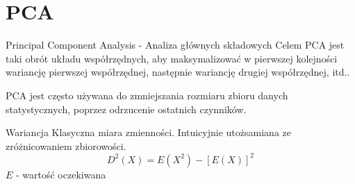 \documentclass[a4paper]{beamer}
\begin{document}
\section{PCA}
\begin{frame}

\begin{block}{Principal Component Analysis - Analiza głównych składowych}
Celem PCA jest taki obrót układu współrzędnych, aby maksymalizować w pierwszej kolejności wariancję pierwszej współrzędnej, następnie wariancję drugiej współrzędnej, itd..
\end{block}

\begin{block}{}
PCA jest często używana do zmniejszania rozmiaru zbioru danych statystycznych, poprzez odrzucenie ostatnich czynników.
\end{block}

\begin{block}{Wariancja}
Klasyczna miara zmienności. Intuicyjnie utożsamiana ze zróżnicowaniem zbiorowości.
$$ D^2(X)=E(X^2)-[E(X)]^2 $$
$E$ - wartość oczekiwana
\end{block}

\end{frame}
\end{document}
